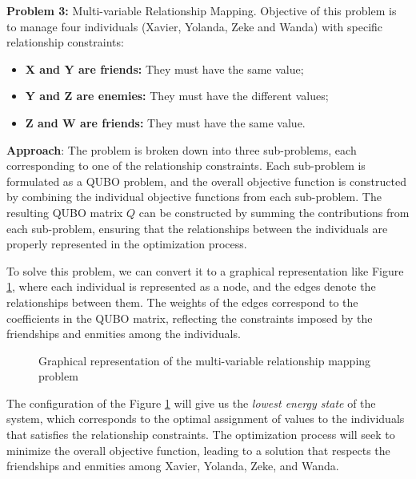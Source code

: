 \textbf{Problem 3:} Multi-variable Relationship Mapping. Objective of this problem is to manage four individuals (Xavier, Yolanda, Zeke and Wanda) with specific relationship constraints: 
\begin{itemize}
    \item \textbf{X and Y are friends:} They must have the same value;
    \item \textbf{Y and Z are enemies:} They must have the different values;
    \item \textbf{Z and W are friends:} They must have the same value.
\end{itemize}

\textbf{Approach}: The problem is broken down into three sub-problems, each corresponding to one of the relationship constraints. Each sub-problem is formulated as a QUBO problem, and the overall objective function is constructed by combining the individual objective functions from each sub-problem. The resulting QUBO matrix $Q$ can be constructed by summing the contributions from each sub-problem, ensuring that the relationships between the individuals are properly represented in the optimization process.

To solve this problem, we can convert it to a graphical representation like
Figure \ref{fig:qubo_graph_3}, where each individual is represented as a node, and the edges denote the relationships between them. The weights of the edges correspond to the coefficients in the QUBO matrix, reflecting the constraints imposed by the friendships and enmities among the individuals.
\begin{figure}
    \centering
    \caption{Graphical representation of the multi-variable relationship mapping problem}\label{fig:qubo_graph_3}
\end{figure}
The configuration of the Figure \ref{fig:qubo_graph_3} will give us the \textit{lowest energy state} of the system, which corresponds to the optimal assignment of values to the individuals that satisfies the relationship constraints. The optimization process will seek to minimize the overall objective function, leading to a solution that respects the friendships and enmities among Xavier, Yolanda, Zeke, and Wanda.

